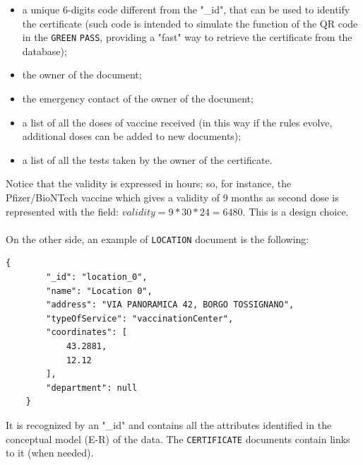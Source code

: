 \documentclass{article}
\begin{document}
\begin{itemize}
    \item a unique 6-digits code different from the "\_id", that can be used to identify the certificate (such code is intended to simulate the function of the QR code in the \verb|GREEN| \verb|PASS|, providing a "fast" way to retrieve the certificate from the database);
    \item the owner of the document;
    \item the emergency contact of the owner of the document;
    \item a list of all the doses of vaccine received (in this way if the rules evolve, additional doses can be added to new documents);
    \item a list of all the tests taken by the owner of the certificate.
\end{itemize}
Notice that the validity is expressed in hours; so, for instance, the Pfizer/BioNTech vaccine which gives a validity of 9 months as second dose is represented with the field: $validity = 9 * 30 * 24 = 6480$.
This is a design choice.\\ \\
\vspace{0.3cm}
On the other side, an example of \verb|LOCATION| document is the following:
\begin{verbatim}
{
        "_id": "location_0",
        "name": "Location 0",
        "address": "VIA PANORAMICA 42, BORGO TOSSIGNANO",
        "typeOfService": "vaccinationCenter",
        "coordinates": [
            43.2881,
            12.12
        ],
        "department": null
    }
\end{verbatim}
It is recognized by an "\_id" and contains all the attributes identified in the conceptual model (E-R) of the data. The \verb|CERTIFICATE| documents contain links to it (when needed).
\end{document}
